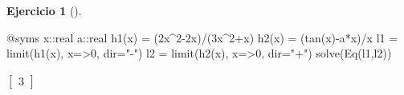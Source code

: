 \documentclass[
  a4paper,
]{scrreport}
\newenvironment{Shaded}{\begin{snugshade}}{\end{snugshade}}
\newcommand{\DataTypeTok}[1]{\textcolor[rgb]{0.68,0.00,0.00}{#1}}
\newcommand{\FloatTok}[1]{\textcolor[rgb]{0.68,0.00,0.00}{#1}}
\newcommand{\FunctionTok}[1]{\textcolor[rgb]{0.28,0.35,0.67}{#1}}
\newcommand{\NormalTok}[1]{\textcolor[rgb]{0.00,0.23,0.31}{#1}}
\newcommand{\OperatorTok}[1]{\textcolor[rgb]{0.37,0.37,0.37}{#1}}
\newcommand{\PreprocessorTok}[1]{\textcolor[rgb]{0.68,0.00,0.00}{#1}}
\newcommand{\StringTok}[1]{\textcolor[rgb]{0.13,0.47,0.30}{#1}}
\theoremstyle{definition}
\newtheorem{exercise}{Ejercicio}[chapter]
\theoremstyle{remark}
\begin{document}
\begin{exercise}[]
\begin{tcolorbox}
\begin{Shaded}
\begin{Highlighting}[]
\PreprocessorTok{@syms}\NormalTok{ x}\OperatorTok{::}\DataTypeTok{real }\NormalTok{a}\OperatorTok{::}\DataTypeTok{real}
\FunctionTok{h1}\NormalTok{(x) }\OperatorTok{=}\NormalTok{ (}\FloatTok{2}\NormalTok{x}\OperatorTok{\^{}}\FloatTok{2}\OperatorTok{{-}}\FloatTok{2}\NormalTok{x)}\OperatorTok{/}\NormalTok{(}\FloatTok{3}\NormalTok{x}\OperatorTok{\^{}}\FloatTok{2}\OperatorTok{+}\NormalTok{x)}
\FunctionTok{h2}\NormalTok{(x) }\OperatorTok{=}\NormalTok{ (}\FunctionTok{tan}\NormalTok{(x)}\OperatorTok{{-}}\NormalTok{a}\OperatorTok{*}\NormalTok{x)}\OperatorTok{/}\NormalTok{x }
\NormalTok{l1 }\OperatorTok{=} \FunctionTok{limit}\NormalTok{(}\FunctionTok{h1}\NormalTok{(x), x}\OperatorTok{=\textgreater{}}\FloatTok{0}\NormalTok{, dir}\OperatorTok{=}\StringTok{"{-}"}\NormalTok{)}
\NormalTok{l2 }\OperatorTok{=} \FunctionTok{limit}\NormalTok{(}\FunctionTok{h2}\NormalTok{(x), x}\OperatorTok{=\textgreater{}}\FloatTok{0}\NormalTok{, dir}\OperatorTok{=}\StringTok{"+"}\NormalTok{)}
\FunctionTok{solve}\NormalTok{(}\FunctionTok{Eq}\NormalTok{(l1,l2))}
\end{Highlighting}
\end{Shaded}

$\left[\begin{smallmatrix}3\end{smallmatrix}\right]$

\end{tcolorbox}

\end{exercise}
\end{document}
